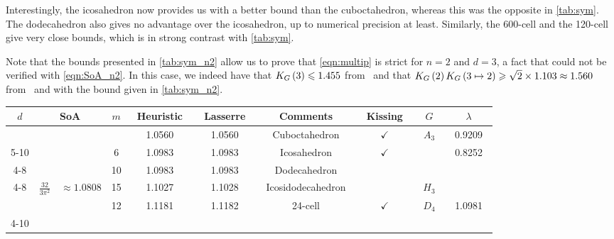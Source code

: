 \documentclass[10pt,aps,notitlepage,onecolumn,pra,superscriptaddress]{revtex4-1}
\renewcommand{\leq}{\leqslant}
\renewcommand{\geq}{\geqslant}
\newcommand{\cc}{\cellcolor[gray]{0.9}}
\newcommand\KG[2]{K_G\left({#1}\ifx#2\empty\else\mapsto\fi{#2}\right)}
\begin{document}
Interestingly, the icosahedron now provides us with a better bound than the cuboctahedron, whereas this was the opposite in \cref{tab:sym}.
The dodecahedron also gives no advantage over the icosahedron, up to numerical precision at least.
Similarly, the 600-cell and the 120-cell give very close bounds, which is in strong contrast with \cref{tab:sym}.

Note that the bounds presented in \cref{tab:sym_n2} allow us to prove that \cref{eqn:multip} is strict for $n=2$ and $d=3$, a fact that could not be verified with \cref{eqn:SoA_n2}.
In this case, we indeed have that $\KG{3}{}\leq1.455$ from~\cite{DIB+23} and that $\KG{2}{}\KG{3}{2}\geq\sqrt2\times1.103\approx1.560$ from~\cite{Kri79} and with the bound given in \cref{tab:sym_n2}.

\begin{table}[ht!]
  \centering
  \begin{tabular}{|c|cl|c|c|c|c|c|c|c|}
    \hline
    ~$d$~               & \multicolumn{2}{c|}{SoA}                                                            & $m$                 & ~Heuristic~ & ~Lasserre~ & Comments              & ~Kissing~    & $G$                     & $\lambda$ \\ \hline
                        &                                            &                                        &                     & 1.0560      & 1.0560     & Cuboctahedron         & $\checkmark$ & ~$A_3$~                 & ~0.9209~  \\ \cline{5-10}
                        &                                            &                                        & \multirow{-2}{*}{6} & \cc1.0983   & \cc1.0983  & Icosahedron           & $\checkmark$ &                         & 0.8252    \\ \cline{4-8}\cline{10-10}
                        &                                            &                                        & 10                  & \cc1.0983   & \cc1.0983  & Dodecahedron          &              &                         &           \\ \cline{4-8}\cline{10-10}
    \multirow{-4}{*}{3} & \multirow{-4}{*}{$\frac{32}{3\pi^2}$}      & \multirow{-4}{*}{$\approx1.0808$}      & 15                  & \cc1.1027   & \cc1.1028  & ~Icosidodecahedron~   &              & \multirow{-3}{*}{$H_3$} &           \\ \hline
                        &                                            &                                        & 12                  & 1.1181      & 1.1182     & 24-cell               & $\checkmark$ & $D_4$                   & 1.0981    \\ \cline{4-10}

\end{tabular}
\end{table}
\end{document}
